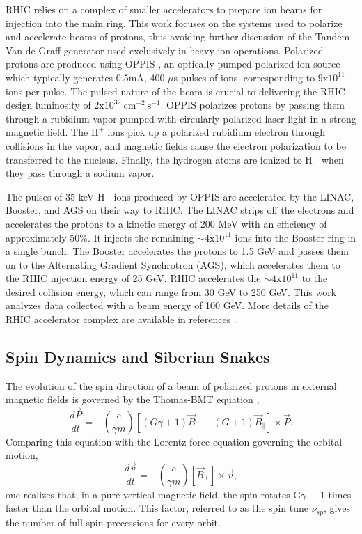 RHIC relies on a complex of smaller accelerators to prepare ion beams for injection into the main ring.  This work focuses on the systems used to polarize and accelerate beams of protons, thus avoiding further discussion of the Tandem Van de Graff generator used exclusively in heavy ion operations.  Polarized protons are produced using OPPIS \cite{Zelenski:2002gb, Zelenski:2008zza}, an optically-pumped polarized ion source which typically generates 0.5mA, 400 $\mu$s pulses of ions, corresponding to $\mathrm{9x10^{11}}$ ions per pulse.  The pulsed nature of the beam is crucial to delivering the RHIC design luminosity of $\mathrm{2x10^{32}~cm^{-2}~s^{-1}}$. OPPIS polarizes protons by passing them through a rubidium vapor pumped with circularly polarized laser light in a strong magnetic field.  The $\mathrm{H^+}$ ions pick up a polarized rubidium electron through collisions in the vapor, and magnetic fields cause the electron polarization to be transferred to the nucleus.  Finally, the hydrogen atoms are ionized to $\mathrm{H^-}$ when they pass through a sodium vapor.

The pulses of 35 keV $\mathrm{H^-}$ ions produced by OPPIS are accelerated by the LINAC, Booster, and AGS on their way to RHIC.  The LINAC strips off the electrons and accelerates the protons to a kinetic energy of 200 MeV with an efficiency of approximately 50\%.  It injects the remaining $\sim \mathrm{4x10^{11}}$ ions into the Booster ring in a single bunch.  The Booster
accelerates the protons to 1.5 GeV and passes them on to the Alternating Gradient Synchrotron (AGS), which accelerates them to the RHIC injection energy of 25 GeV.  RHIC accelerates the $\sim \mathrm{4x10^{11}}$ to the desired collision energy, which can range from 30 GeV to 250 GeV.  This work analyzes data collected with a beam energy of 100 GeV.  More details of the RHIC accelerator complex are available in references \cite{Harrison:2003sb, Hahn:2003sc, Alekseev:2003sk}.

\subsection{Spin Dynamics and Siberian Snakes}

The evolution of the spin direction of a beam of polarized protons in external magnetic fields is governed by the Thomas-BMT equation \cite{Thomas:1927yu, Bargmann:1959gz},
%
\begin{equation}
  \frac{d\vec{P}}{dt} = -\left(\frac{e}{\gamma m}\right)[(G\gamma + 1) \vec{B}_{\perp} + (G + 1) \vec{B}_{\parallel}] \times \vec{P}.
\end{equation}
%
Comparing this equation with the Lorentz force equation governing the orbital motion,
%
\begin{equation}
  \frac{d\vec{v}}{dt} = -\left(\frac{e}{\gamma m}\right)[\vec{B}_{\perp}] \times \vec{v},
\end{equation}
%
one realizes that, in a pure vertical magnetic field, the spin rotates G$\gamma$ + 1 times faster than the orbital motion. This factor, referred to as the spin tune $\nu_{sp}$, gives the number of full spin precessions for every orbit.

